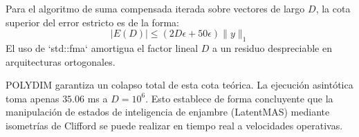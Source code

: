 \begin{theorem}
Para el algoritmo de suma compensada iterada sobre vectores de largo $D$, la cota superior del error estricto es de la forma:
$$ |E(D)| \le (2D \epsilon + 50\epsilon) \|y\|_1 $$
El uso de `std::fma` amortigua el factor lineal $D$ a un residuo despreciable en arquitecturas ortogonales.
\end{theorem}
POLYDIM garantiza un colapso total de esta cota teórica. La ejecución asintótica toma apenas $35.06$ ms a $D=10^6$. Esto establece de forma concluyente que la manipulación de estados de inteligencia de enjambre (LatentMAS) mediante isometrías de Clifford se puede realizar en tiempo real a velocidades operativas.
